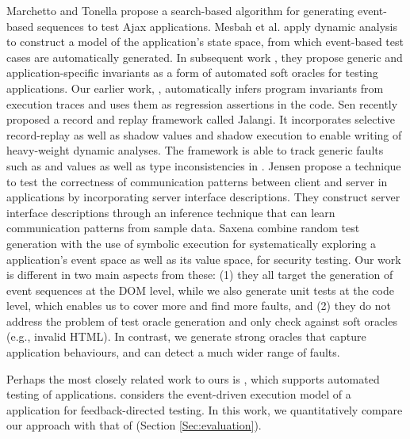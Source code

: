 Marchetto and Tonella \cite{marchetto:search} propose a search-based algorithm for generating event-based sequences to test Ajax applications. 
Mesbah et al.  \cite{mesbah:tweb11} apply dynamic analysis to construct a model of the application's state space, from which event-based test cases are automatically generated. In subsequent work \cite{mesbah:tse12}, they propose generic and application-specific invariants as a form of automated soft oracles for testing \ajax applications.  Our earlier work, \jsart \cite{mirshokraie:icwe12},  automatically infers program invariants from \javascript execution traces and uses them as regression assertions in the code. 
Sen \etal \cite{sen:fse13} recently proposed a record and replay framework called Jalangi. It incorporates selective record-replay as well as shadow values and shadow execution to enable writing of heavy-weight dynamic analyses.
The framework is able to track generic faults such as  and  values as well as type inconsistencies in \javascript. 
Jensen \etal \cite{jensen:fse13} propose a technique to test the correctness of communication patterns between client and server in \ajax applications by incorporating server interface descriptions.
They construct server interface descriptions through an inference technique that can learn communication patterns from sample data.
Saxena \etal \cite{song:symb10} combine random test generation with the use of symbolic execution for systematically exploring a \javascript application's event space as well as its value space, for security testing.
Our work is different in two main aspects from these: (1) they all target the generation of event sequences at the DOM level, while we also generate unit tests at the \javascript code level, which enables us to cover more and find more faults,
and (2) they do not address the problem of test oracle generation and only check against soft oracles (e.g., invalid HTML). In contrast, we generate strong oracles that capture
application behaviours, and can detect a much wider range of faults.

Perhaps the most closely related work to ours is \artemis \cite{artzi:icse11}, which supports automated testing of \javascript applications.
\artemis considers the event-driven execution model of a \javascript application for feedback-directed testing.
In this work, we quantitatively compare our approach with that of \artemis (Section \ref{Sec:evaluation}).

